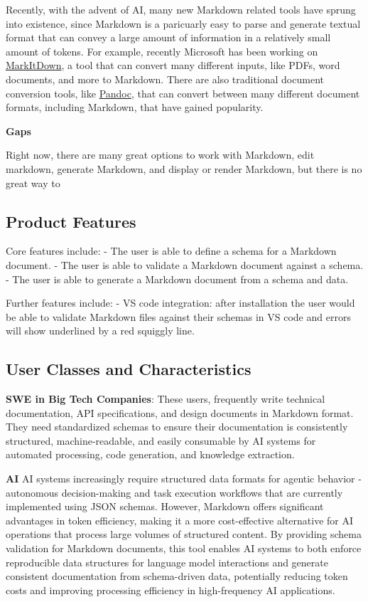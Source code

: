 \documentclass[
]{article}
\begin{document}
Recently, with the advent of AI, many new Markdown related tools have
sprung into existence, since Markdown is a paricuarly easy to parse and
generate textual format that can convey a large amount of information in
a relatively small amount of tokens. For example, recently Microsoft has
been working on
\href{https://github.com/microsoft/markitdown}{MarkItDown}, a tool that
can convert many different inputs, like PDFs, word documents, and more
to Markdown. There are also traditional document conversion tools, like
\href{https://pandoc.org/}{Pandoc}, that can convert between many
different document formats, including Markdown, that have gained
popularity.

\textbf{Gaps}

Right now, there are many great options to work with Markdown, edit
markdown, generate Markdown, and display or render Markdown, but there
is no great way to

\subsection{Product Features}\label{product-features}

Core features include: - The user is able to define a schema for a
Markdown document. - The user is able to validate a Markdown document
against a schema. - The user is able to generate a Markdown document
from a schema and data.

Further features include: - VS code integration: after installation the
user would be able to validate Markdown files against their schemas in
VS code and errors will show underlined by a red squiggly line.

\subsection{User Classes and Characteristics}\label{user-classes}

\textbf{SWE in Big Tech Companies}: These users, frequently write
technical documentation, API specifications, and design documents in
Markdown format. They need standardized schemas to ensure their
documentation is consistently structured, machine-readable, and easily
consumable by AI systems for automated processing, code generation, and
knowledge extraction.

\textbf{AI} AI systems increasingly require structured data formats for
agentic behavior - autonomous decision-making and task execution
workflows that are currently implemented using JSON schemas. However,
Markdown offers significant advantages in token efficiency, making it a
more cost-effective alternative for AI operations that process large
volumes of structured content. By providing schema validation for
Markdown documents, this tool enables AI systems to both enforce
reproducible data structures for language model interactions and
generate consistent documentation from schema-driven data, potentially
reducing token costs and improving processing efficiency in
high-frequency AI applications.
\end{document}

